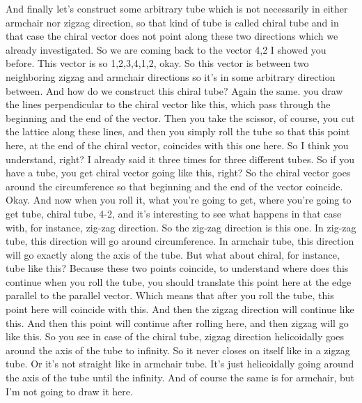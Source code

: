 And finally let's construct some arbitrary tube which is not necessarily in either armchair nor zigzag direction, so that kind of tube is called chiral tube and in that case the chiral vector does not point along these two directions which we already investigated. So we are coming back to the vector 4,2 I showed you before. This vector is so 1,2,3,4,1,2, okay. So this vector is between two neighboring zigzag and armchair directions so it's in some arbitrary direction between. And how do we construct this chiral tube? Again the same. you draw the lines perpendicular to the chiral vector like this, which pass through the beginning and the end of the vector. Then you take the scissor, of course, you cut the lattice along these lines, and then you simply roll the tube so that this point here, at the end of the chiral vector, coincides with this one here. So I think you understand, right? I already said it three times for three different tubes. So if you have a tube, you get chiral vector going like this, right? So the chiral vector goes around the circumference so that beginning and the end of the vector coincide. Okay. And now when you roll it, what you're going to get, where you're going to get tube, chiral tube, 4-2, and it's interesting to see what happens in that case with, for instance, zig-zag direction. So the zig-zag direction is this one. In zig-zag tube, this direction will go around circumference. In armchair tube, this direction will go exactly along the axis of the tube. But what about chiral, for instance, tube like this? Because these two points coincide, to understand where does this continue when you roll the tube, you should translate this point here at the edge parallel to the parallel vector. Which means that after you roll the tube, this point here will coincide with this. And then the zigzag direction will continue like this. And then this point will continue after rolling here, and then zigzag will go like this. So you see in case of the chiral tube, zigzag direction helicoidally goes around the axis of the tube to infinity. So it never closes on itself like in a zigzag tube. Or it's not straight like in armchair tube. It's just helicoidally going around the axis of the tube until the infinity. And of course the same is for armchair, but I'm not going to draw it here.
